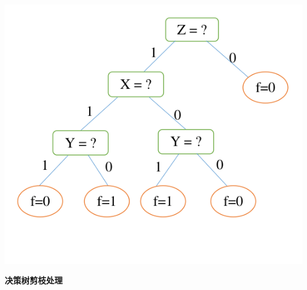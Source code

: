 \documentclass[answers]{exam}  %
\begin{document}
\begin{questions}
\begin{solution}
        \centerline{\includegraphics[width=0.7\linewidth]{ALL.png}}
    \end{solution}


\question [25] \textbf{决策树剪枝处理} \label{ch4_prob:prunning}


\end{questions}
\end{document}
